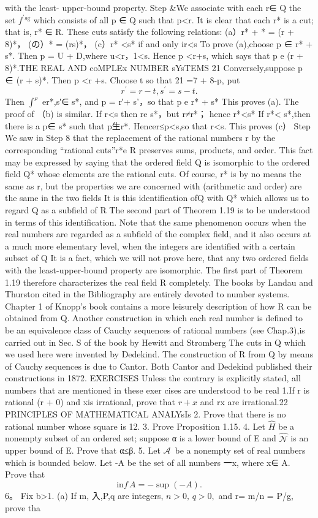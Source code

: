 with the least- upper-bound property. Step &We associate with each r∈ Q the set $f^{\prime}{}^{\mathrm{sg}}$ which consists of all p ∈ Q such that p<r. It is clear that each r* is a cut; that is, r* ∈ R. These cuts satisfy the following relations: (a）r* + * = (r + 8)*， (の）* = (rs)*， (c）r* <s* if and only ir<s To prove (a),choose p ∈ r* + s*. Then p = U + D,where u<r，1<s. Hence p <r+s, which says that p e (r + 8)*.THE REAL AND coMPLEx NUMBER sYsTEMS 21 Conversely,suppose p ∈ (r + s)*. Then p <r +s. Choose t so that 21 =7 + 8-p, put $$ \displaystyle r^{\prime}=r-t,s^{\prime}=s-t. $$ Then $\textstyle{\int}^{\rho}{}$ er*,s′∈ s*, and p = r′+ s'，so that p e r* + s* This proves (a). The proof of （b) is similar. If r<s then re s*，but r≠r*； hence r*<s* If r*< s*,then there is a p∈ s* such that p生r*. Hencer≤p<s,so that r<s. This proves (c） Step We saw in Step 8 that the replacement of the rational numbers r by the corresponding “rational cuts”r*e R preserves sums, products, and order. This fact may be expressed by saying that the ordered field Q is isomorphic to the ordered field Q* whose elements are the rational cuts. Of course, r* is by no means the same as r, but the properties we are concerned with (arithmetic and order) are the same in the two fields It is this identification ofQ with Q* which allows us to regard Q as a subfield of R The second part of Theorem 1.19 is to be understood in terms of this identification. Note that the same phenomenon occurs when the real numbers are regarded as a subfield of the complex field, and it also occurs at a much more elementary level, when the integers are identified with a certain subset of Q It is a fact, which we will not prove here, that any two ordered fields with the least-upper-bound property are isomorphic. The first part of Theorem 1.19 therefore characterizes the real field R completely. The books by Landau and Thurston cited in the Bibliography are entirely devoted to number systems. Chapter 1 of Knopp's book contains a more leisurely description of how R can be obtained from Q. Another construction in which each real number is defined to be an equivalence class of Cauchy sequences of rational numbers (see Chap.3),is carried out in Sec. S of the book by Hewitt and Stromberg The cuts in Q which we used here were invented by Dedekind. The construction of R from Q by means of Cauchy sequences is due to Cantor. Both Cantor and Dedekind published their constructions in 1872. EXERCISES Unless the contrary is explicitly stated, all numbers that are mentioned in these exer cises are understood to be real 1.If r is rational (r + 0) and xis irrational, prove that $\scriptstyle{r+x}$ and rx are irrational.22 PRINCIPLES OF MATHEMATICAL ANALYsIs 2. Prove that there is no rational number whose square is 12. 3. Prove Proposition 1.15. 4. Let $\widehat{H}$ be a nonempty subset of an ordered set; suppose α is a lower bound of E and $\textstyle{\hat{\mathcal{N}}}$ is an upper bound of E. Prove that α≤β. 5. Let ${\mathcal{A}}\,$ be a nonempty set of real numbers which is bounded below. Let -A be the set of all numbers 一x, where x∈ A. Prove that $$ \mathrm{in}f\,A=-\operatorname{sup}(-A). $$ 6。 Fix b>1. (a) If m, 入,P,q are integers, $n>0,\,q>0,$ and r= m/n = P/g, prove tha $$ 